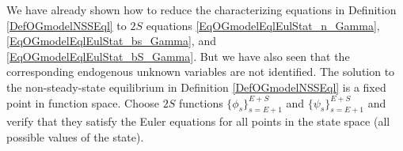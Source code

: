 \documentclass[letterpaper,12pt]{article}
\theoremstyle{definition}
\begin{document}
    We have already shown how to reduce the characterizing equations in Definition \ref{DefOGmodelNSSEql} to $2S$ equations \eqref{EqOGmodelEqlEulStat_n_Gamma}, \eqref{EqOGmodelEqlEulStat_bs_Gamma}, and \eqref{EqOGmodelEqlEulStat_bS_Gamma}. But we have also seen that the corresponding endogenous unknown variables are not identified. The solution to the non-steady-state equilibrium in Definition \ref{DefOGmodelNSSEql} is a fixed point in function space. Choose $2S$ functions $\{\phi_s\}_{s=E+1}^{E+S}$ and $\{\psi_s\}_{s=E+1}^{E+S}$ and verify that they satisfy the Euler equations for all points in the state space (all possible values of the state).


\end{document}
